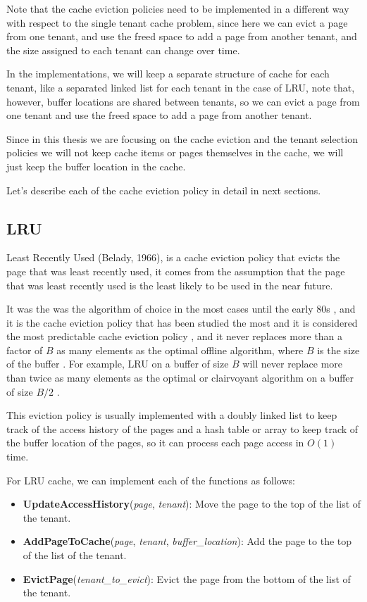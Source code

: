 Note that the cache eviction policies need to be implemented in a different way with respect
to the single tenant cache problem, since here we can evict a page from one tenant, and 
use the freed space to add a page from another tenant, and the size assigned to each tenant
can change over time.

In the implementations, we will keep a separate structure of cache
for each tenant, like a separated linked list for each tenant in the case of LRU,
note that, however, buffer locations are shared between tenants, so we can evict a page
from one tenant and use the freed space to add a page from another tenant.

Since in this thesis we are focusing on the cache eviction and the tenant selection 
policies we will not keep cache items or pages themselves in the cache, we will just keep
the buffer location in the cache. 

Let's describe each of the cache eviction policy in detail in next sections.

\subsection{LRU}

Least Recently Used (Belady, 1966), is a cache eviction policy that evicts the page that was least
recently used, it comes from the assumption that the page that was least recently used is the
least likely to be used in the near future.

It was the was the algorithm of choice in the most cases until the early 80s \cite{2q-article},
and it is the cache eviction policy that has been studied the most and it is considered
the most predictable cache eviction policy \cite{lru-analysis-article}, and it never
replaces more than a factor of $B$ as many elements as the optimal offline algorithm, where $B$
is the size of the buffer \cite{lru-factor-b}. For example, LRU on a buffer of size $B$ will
never replace more than twice as many elements as the optimal or clairvoyant algorithm on a 
buffer of size $B/2$ \cite{2q-article}.

This eviction policy is usually implemented with a doubly linked list to keep track of the
access history of the pages and a hash table or array to keep track of the buffer location
of the pages, so it can process each page access in $O(1)$ time.

For LRU cache, we can implement each of the functions as follows:

\begin{itemize}
    \item \textbf{UpdateAccessHistory}(\textit{page}, \textit{tenant}): Move the page to the top of the list of the tenant.
    \item \textbf{AddPageToCache}(\textit{page}, \textit{tenant}, \textit{buffer\_location}): Add the page to the top of the list of the tenant.
    \item \textbf{EvictPage}(\textit{tenant\_to\_evict}): Evict the page from the bottom of the list of the tenant.
\end{itemize}

